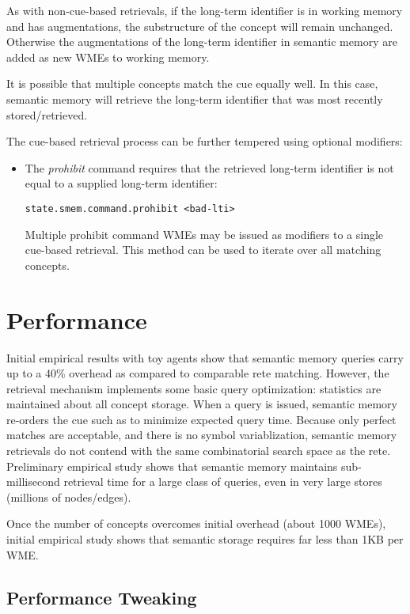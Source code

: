 As with non-cue-based retrievals, if the long-term identifier is in working memory and has augmentations, the substructure of the concept will remain unchanged. Otherwise the augmentations of the long-term identifier in semantic memory are added as new WMEs to working memory.

It is possible that multiple concepts match the cue equally well.  In this case, semantic memory will retrieve the long-term identifier that was most recently stored/retrieved.

The cue-based retrieval process can be further tempered using optional modifiers:

\begin{itemize}
\item The \emph{prohibit} command requires that the retrieved long-term identifier is not equal to a supplied long-term identifier:
\begin{verbatim}
state.smem.command.prohibit <bad-lti>
\end{verbatim}
Multiple prohibit command WMEs may be issued as modifiers to a single cue-based retrieval.  This method can be used to iterate over all matching concepts.
\end{itemize}

\section{Performance}
\label{SMEM-perf}

Initial empirical results with toy agents show that semantic memory queries carry up to a 40\% overhead as compared to comparable rete matching.  However, the retrieval mechanism implements some basic query optimization: statistics are maintained about all concept storage.  When a query is issued, semantic memory re-orders the cue such as to minimize expected query time.  Because only perfect matches are acceptable, and there is no symbol variablization, semantic memory retrievals do not contend with the same combinatorial search space as the rete.  Preliminary empirical study shows that semantic memory maintains sub-millisecond retrieval time for a large class of queries, even in very large stores (millions of nodes/edges).

Once the number of concepts overcomes initial overhead (about 1000 WMEs), initial empirical study shows that semantic storage requires far less than 1KB per WME.

\subsection{Performance Tweaking}

